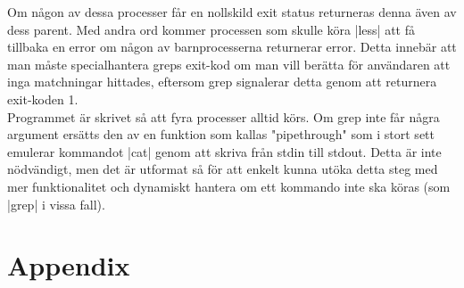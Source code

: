 \documentclass[paper=a4, fontsize=11pt]{scrartcl} %
\numberwithin{equation}{section} %
\numberwithin{figure}{section} %
\numberwithin{table}{section} %
\begin{document}
Om någon av dessa processer får en nollskild exit status returneras denna även
av dess parent. Med andra ord kommer processen som skulle köra |less| att få
tillbaka en error om någon av barnprocesserna returnerar error.
Detta innebär att man måste specialhantera greps exit-kod om man vill berätta
för användaren att inga matchningar hittades, eftersom grep signalerar detta
genom att returnera exit-koden 1.
\\ %

Programmet är skrivet så att fyra processer alltid körs. Om grep inte får
några argument ersätts den av en funktion som kallas "pipethrough" som i stort
sett emulerar kommandot |cat| genom att skriva från stdin till stdout.
Detta är inte nödvändigt, men det är utformat så för att enkelt kunna utöka
detta steg med mer funktionalitet och dynamiskt hantera om ett kommando inte
ska köras (som |grep| i vissa fall).


\newpage
\section*{Appendix}
\end{document}
